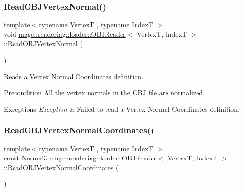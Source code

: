 \subsubsection{\texorpdfstring{Read\+O\+B\+J\+Vertex\+Normal()}{ReadOBJVertexNormal()}}
{\footnotesize\ttfamily template$<$typename VertexT , typename IndexT $>$ \\
void \mbox{\hyperlink{classmage_1_1rendering_1_1loader_1_1_o_b_j_reader}{mage\+::rendering\+::loader\+::\+O\+B\+J\+Reader}}$<$ VertexT, IndexT $>$\+::Read\+O\+B\+J\+Vertex\+Normal (\begin{DoxyParamCaption}{ }\end{DoxyParamCaption})\hspace{0.3cm}{\ttfamily [private]}}

Reads a Vertex Normal Coordinates definition.

\begin{DoxyPrecond}{Precondition}
All the vertex normals in the O\+BJ file are normalized. 
\end{DoxyPrecond}

\begin{DoxyExceptions}{Exceptions}
{\em \mbox{\hyperlink{classmage_1_1_exception}{Exception}}} & Failed to read a Vertex Normal Coordinates definition. \\
\hline
\end{DoxyExceptions}
\mbox{\label{classmage_1_1rendering_1_1loader_1_1_o_b_j_reader_aa91768722fd418aeba3f12915e8e1525}} 
\subsubsection{\texorpdfstring{Read\+O\+B\+J\+Vertex\+Normal\+Coordinates()}{ReadOBJVertexNormalCoordinates()}}
{\footnotesize\ttfamily template$<$typename VertexT , typename IndexT $>$ \\
const \mbox{\hyperlink{structmage_1_1_normal3}{Normal3}} \mbox{\hyperlink{classmage_1_1rendering_1_1loader_1_1_o_b_j_reader}{mage\+::rendering\+::loader\+::\+O\+B\+J\+Reader}}$<$ VertexT, IndexT $>$\+::Read\+O\+B\+J\+Vertex\+Normal\+Coordinates (\begin{DoxyParamCaption}{ }\end{DoxyParamCaption})\hspace{0.3cm}{\ttfamily [private]}}

